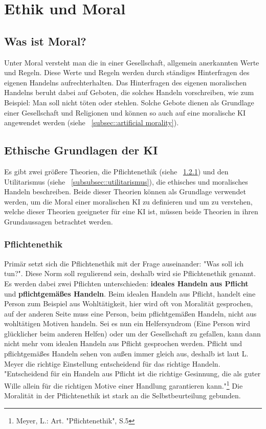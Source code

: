 \section{Ethik und Moral}\label{sec:ethik und moral}

\subsection{Was ist Moral?}\label{subsec::moral}

Unter Moral versteht man die in einer Gesellschaft, allgemein anerkannten Werte und Regeln.
Diese Werte und Regeln werden durch ständiges Hinterfragen des eigenen Handelns aufrechterhalten.
Das Hinterfragen des eigenen moralischen Handelns beruht dabei auf Geboten, die solches Handeln vorschreiben,
wie zum Beispiel: Man soll nicht töten oder stehlen.
Solche Gebote dienen als Grundlage einer Gesellschaft und Religionen und können so auch auf
eine moralische KI angewendet werden (siehe ~\ref{subsec::artificial morality}). %


\subsection{Ethische Grundlagen der KI}\label{subsec::ethische grundlagen}

Es gibt zwei größere Theorien, die Pflichtenethik (siehe ~\ref{subsubsec::pflichtenethik}) und den Utilitarismus (siehe ~\ref{subsubsec::utilitarismus}),
die ethisches und moralisches Handeln beschreiben.
Beide dieser Theorien können als Grundlage verwendet werden, um die Moral einer moralischen KI zu definieren und um zu verstehen, welche
dieser Theorien geeigneter für eine KI ist, müssen beide Theorien in ihren Grundaussagen betrachtet werden.

\subsubsection{Pflichtenethik}\label{subsubsec::pflichtenethik}

Primär setzt sich die Pflichtenethik mit der Frage auseinander: "Was soll ich tun?".
Diese Norm soll regulierend sein, deshalb wird sie Pflichtenethik genannt.
Es werden dabei zwei Pflichten unterschieden:
\textbf{ideales Handeln aus Pflicht} und \textbf{pflichtgemäßes Handeln}.
Beim idealen Handeln aus Pflicht, handelt eine Person zum Beispiel aus Wohltätigkeit,
hier wird oft von Moralität gesprochen, auf der
anderen Seite muss eine Person, beim pflichtgemäßen Handeln, nicht aus wohltätigen Motiven handeln.
Sei es nun ein Helfersyndrom (Eine Person wird glücklicher beim anderen Helfen) oder um der Gesellschaft zu gefallen,
kann dann nicht mehr vom idealen Handeln aus Pflicht gesprochen werden.
Pflicht und pflichtgemäßes Handeln sehen von außen immer gleich aus, deshalb ist laut L. Meyer die richtige
Einstellung entscheidend für das richtige Handeln.
"Entscheidend für ein Handeln aus Pflicht ist die richtige Gesinnung,
die als guter Wille allein für die richtigen Motive einer Handlung garantieren kann."\footnote{ Meyer, L.: Art. "Pflichtenethik", S.5}
Die Moralität in der Pflichtenethik ist stark an die Selbstbeurteilung gebunden.


